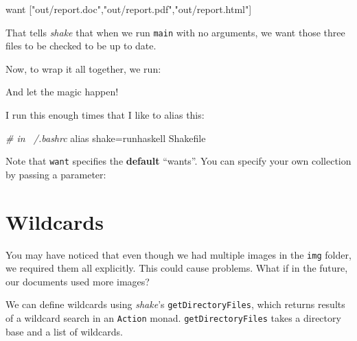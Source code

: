 \documentclass[]{article}
\newenvironment{Shaded}{}{}
\newcommand{\StringTok}[1]{\textcolor[rgb]{0.25,0.44,0.63}{{#1}}}
\newcommand{\CommentTok}[1]{\textcolor[rgb]{0.38,0.63,0.69}{\textit{{#1}}}}
\newcommand{\BuiltInTok}[1]{{#1}}
\newcommand{\ExtensionTok}[1]{{#1}}
\newcommand{\NormalTok}[1]{{#1}}
\begin{document}
\begin{Shaded}
\begin{Highlighting}[]
\NormalTok{want [}\StringTok{"out/report.doc"}\NormalTok{,}\StringTok{"out/report.pdf"}\NormalTok{,}\StringTok{"out/report.html"}\NormalTok{]}
\end{Highlighting}
\end{Shaded}

That tells \emph{shake} that when we run \texttt{main} with no arguments, we
want those three files to be checked to be up to date.

Now, to wrap it all together, we run:

\begin{Shaded}
\end{Shaded}

And let the magic happen!

I run this enough times that I like to alias this:

\begin{Shaded}
\begin{Highlighting}[]
\CommentTok{# in ~/.bashrc}
\BuiltInTok{alias} \NormalTok{shake=runhaskell Shakefile}
\end{Highlighting}
\end{Shaded}

Note that \texttt{want} specifies the \textbf{default} ``wants''. You can
specify your own collection by passing a parameter:

\begin{Shaded}
\end{Shaded}

\section{Wildcards}\label{wildcards}

You may have noticed that even though we had multiple images in the \texttt{img}
folder, we required them all explicitly. This could cause problems. What if in
the future, our documents used more images?

We can define wildcards using \emph{shake}'s \texttt{getDirectoryFiles}, which
returns results of a wildcard search in an \texttt{Action} monad.
\texttt{getDirectoryFiles} takes a directory base and a list of wildcards.
\end{document}

